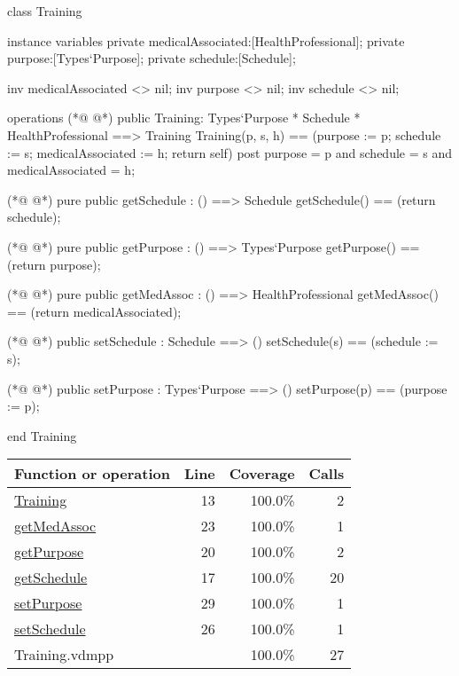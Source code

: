 \begin{vdmpp}[breaklines=true]
class Training
 
instance variables
 private medicalAssociated:[HealthProfessional];
 private purpose:[Types`Purpose];
 private schedule:[Schedule];

 inv medicalAssociated <> nil;
 inv purpose <> nil;
 inv schedule <> nil;

operations
(*@
\label{Training:13}
@*)
 public Training: Types`Purpose * Schedule * HealthProfessional ==> Training
   Training(p, s, h) == (purpose := p; schedule := s; medicalAssociated := h; return self)
 post purpose = p and schedule = s and medicalAssociated = h;

(*@
\label{getSchedule:17}
@*)
 pure public getSchedule : () ==> Schedule
   getSchedule() == (return schedule);
 
(*@
\label{getPurpose:20}
@*)
  pure public getPurpose : () ==> Types`Purpose
  getPurpose() == (return purpose); 
 
(*@
\label{getMedAssoc:23}
@*)
 pure public getMedAssoc : () ==> HealthProfessional
  getMedAssoc() == (return medicalAssociated); 

(*@
\label{setSchedule:26}
@*)
 public setSchedule : Schedule ==> ()
   setSchedule(s) == (schedule := s);
 
(*@
\label{setPurpose:29}
@*)
 public setPurpose : Types`Purpose ==> ()
   setPurpose(p) == (purpose := p);
 
 end Training
\end{vdmpp}
\bigskip
\begin{longtable}{|l|r|r|r|}
\hline
Function or operation & Line & Coverage & Calls \\
\hline
\hline
\hyperref[Training:13]{Training} & 13&100.0\% & 2 \\
\hline
\hyperref[getMedAssoc:23]{getMedAssoc} & 23&100.0\% & 1 \\
\hline
\hyperref[getPurpose:20]{getPurpose} & 20&100.0\% & 2 \\
\hline
\hyperref[getSchedule:17]{getSchedule} & 17&100.0\% & 20 \\
\hline
\hyperref[setPurpose:29]{setPurpose} & 29&100.0\% & 1 \\
\hline
\hyperref[setSchedule:26]{setSchedule} & 26&100.0\% & 1 \\
\hline
\hline
Training.vdmpp & & 100.0\% & 27 \\
\hline
\end{longtable}

